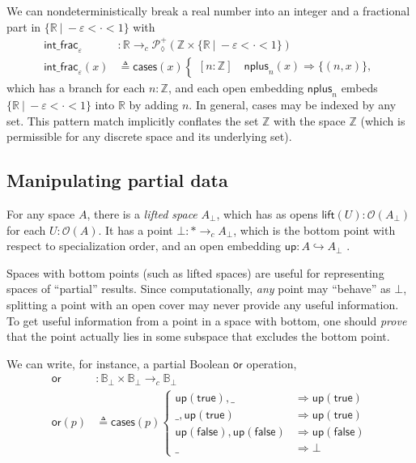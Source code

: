 \documentclass[conference]{IEEEtran}
\newcommand{\PLower}{\mathcal{P}_\lozenge}
\newcommand{\hookto}{\hookrightarrow}
\newcommand{\cto}{\to_c}
\newcommand{\R}{\mathbb{R}}
\newcommand{\Z}{\mathbb{Z}}
\newcommand{\suchthat}{\ |\ }
\newcommand{\One}{\ast}
\newcommand{\Open}[1]{\mathcal{O}({#1})}
\newcommand{\bool}{\mathbb{B}}
\newcommand{\wildcard}{\_}
\newcommand{\Branch}{\Rightarrow}
\newcommand{\up}{\mathsf{up}}
\newcommand{\btrue}{\mathsf{true}}
\newcommand{\bfalse}{\mathsf{false}}
\begin{document}
We can nondeterministically break a real number into an integer and a fractional part in $\{ \R \suchthat -\varepsilon < \cdot < 1 \}$ with
\begin{align*}
\mathsf{int\_frac}_\varepsilon &: \R \cto \PLower^+(\Z \times \{ \R \suchthat -\varepsilon < \cdot < 1 \})
\\ \mathsf{int\_frac}_\varepsilon(x) &\triangleq \mathsf{cases}(x)
\begin{cases}
[n : \Z] \quad \mathsf{nplus}_n(x) \Branch \{ (n, x) \},
\end{cases}
\end{align*}
which has a branch for each $n : \Z$, and each open embedding $\mathsf{nplus}_n$ embeds $\{ \R \suchthat -\varepsilon < \cdot < 1 \}$ into $\R$ by adding $n$. In general, cases may be indexed by any set. This pattern match implicitly conflates the set $\Z$ with the space $\Z$ (which is permissible for any discrete space and its underlying set).

\subsection{Manipulating partial data}
\label{s:ex:partial}

For any space $A$, there is a \emph{lifted space} $A_\bot$, which has as opens $\mathsf{lift}(U) : \Open{A_\bot}$ for each $U : \Open{A}$. It has a point $\bot : \One \cto A_\bot$, which is the bottom point with respect to specialization order, and an open embedding $ \up : A \hookto A_\bot$  \cite{topologyvialogic}.

Spaces with bottom points (such as lifted spaces) are useful for representing spaces of ``partial'' results. Since computationally, \emph{any} point may ``behave'' as $\bot$, splitting a point with an open cover may never provide any useful information. To get useful information from a point in a space with bottom, one should \emph{prove} that the point actually lies in some subspace that excludes the bottom point.

We can write, for instance, a partial Boolean $\mathsf{or}$ operation,
\begin{align*}
\mathsf{or} &: \bool_\bot \times \bool_\bot \cto \bool_\bot
\\ \mathsf{or}(p) &\triangleq \mathsf{cases}(p)
\begin{cases}
\up(\btrue), \wildcard &\Branch \up(\btrue)
\\ \wildcard, \up(\btrue) &\Branch \up(\btrue)
\\ \up(\bfalse), \up(\bfalse) &\Branch \up(\bfalse)
\\ \wildcard &\Branch \bot
\end{cases}
\end{align*}
\end{document}
